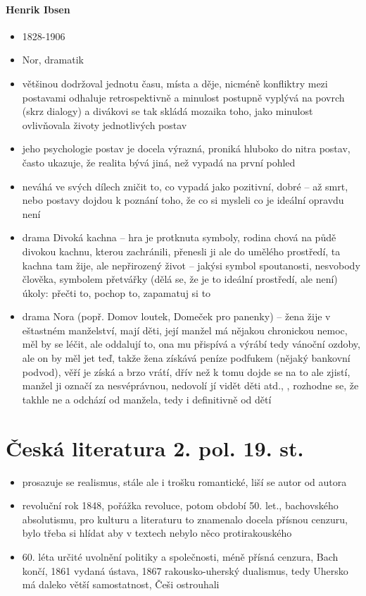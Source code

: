 \documentclass{article}
\begin{document}
\subsection{Henrik Ibsen}
\begin{itemize}
  \item 1828-1906
  \item Nor, dramatik
  \item většinou dodržoval jednotu času, místa a děje, nicméně konfliktry mezi postavami odhaluje retrospektivně a minulost postupně vyplývá na povrch (skrz dialogy) a divákovi se tak skládá mozaika toho, jako minulost ovlivňovala životy jednotlivých postav
  \item jeho psychologie postav je docela výrazná, proniká hluboko do nitra postav, často ukazuje, že realita bývá jiná, než vypadá na první pohled
  \item neváhá ve svých dílech zničit to, co vypadá jako pozitivní, dobré -- až smrt, nebo postavy dojdou k poznání toho, že co si mysleli co je ideální opravdu není
  \item drama Divoká kachna -- hra je protknuta symboly, rodina chová na půdě divokou kachnu, kterou zachránili, přenesli ji ale do umělého prostředí, ta kachna tam žije, ale nepřirozený život -- jakýsi symbol spoutanosti, nesvobody člověka, symbolem přetvářky (dělá se, že je to ideální prostředí, ale není)
  úkoly: přečti to, pochop to, zapamatuj si to
  \item drama Nora (popř. Domov loutek, Domeček pro panenky) -- žena žije v eštastném manželství, mají děti, její manžel má nějakou chronickou nemoc, měl by se léčit, ale oddalují to, ona mu přispívá a výrábí tedy vánoční ozdoby, ale on by měl jet teď, takže žena získává peníze podfukem (nějaký bankovní podvod), věří je získá a brzo vrátí, dřív než k tomu dojde se na to ale zjistí, manžel ji označí za nesvéprávnou, nedovolí jí vidět děti atd., , rozhodne se, že takhle ne a odchází od manžela, tedy i definitivně od dětí
\end{itemize}

\part{Česká literatura 2. pol. 19. st.}
\begin{itemize}
  \item prosazuje se realismus, stále ale i trošku romantické, liší se autor od autora
  \item revoluční rok 1848, pořážka revoluce, potom období 50. let., bachovského absolutismu, pro kulturu a literaturu to znamenalo docela přísnou cenzuru, bylo třeba si hlídat aby v textech nebylo něco protirakouského
  \item 60. léta určité uvolnění politiky a společnosti, méně přísná cenzura, Bach končí, 1861 vydaná ústava, 1867 rakousko-uherský dualismus, tedy Uhersko má daleko větší samostatnost, Češi ostrouhali
\end{itemize}
\end{document}

